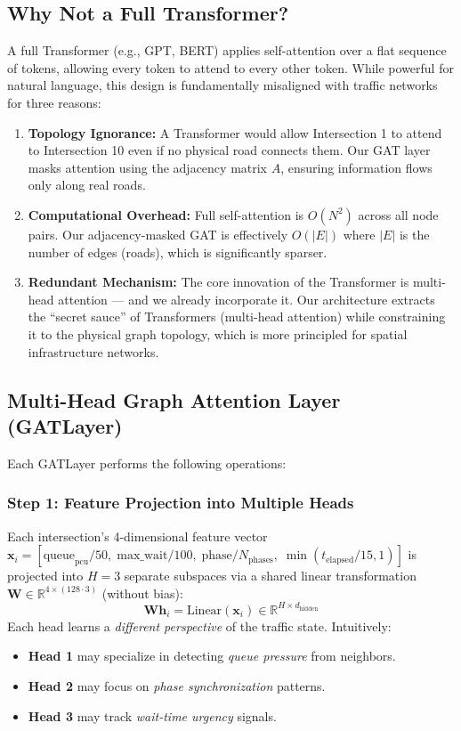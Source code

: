 \documentclass[12pt, onecolumn]{IEEEtran}
\begin{document}
\subsection{Why Not a Full Transformer?}
A full Transformer (e.g., GPT, BERT) applies self-attention over a flat sequence of tokens, allowing every token to attend to every other token. While powerful for natural language, this design is fundamentally misaligned with traffic networks for three reasons:
\begin{enumerate}
    \item \textbf{Topology Ignorance:} A Transformer would allow Intersection 1 to attend to Intersection 10 even if no physical road connects them. Our GAT layer masks attention using the adjacency matrix $A$, ensuring information flows only along real roads.
    \item \textbf{Computational Overhead:} Full self-attention is $O(N^2)$ across all node pairs. Our adjacency-masked GAT is effectively $O(|E|)$ where $|E|$ is the number of edges (roads), which is significantly sparser.
    \item \textbf{Redundant Mechanism:} The core innovation of the Transformer is multi-head attention --- and we already incorporate it. Our architecture extracts the ``secret sauce'' of Transformers (multi-head attention) while constraining it to the physical graph topology, which is more principled for spatial infrastructure networks.
\end{enumerate}

\subsection{Multi-Head Graph Attention Layer (GATLayer)}
Each GATLayer performs the following operations:

\subsubsection{Step 1: Feature Projection into Multiple Heads}
Each intersection's 4-dimensional feature vector $\mathbf{x}_i = [\text{queue}_{\text{pcu}}/50, \; \text{max\_wait}/100, \; \text{phase}/N_{\text{phases}}, \; \min(t_{\text{elapsed}}/15, 1)]$ is projected into $H=3$ separate subspaces via a shared linear transformation $\mathbf{W} \in \mathbb{R}^{4 \times (128 \cdot 3)}$ (without bias):
\begin{equation}
    \mathbf{W}\mathbf{h}_i = \text{Linear}(\mathbf{x}_i) \in \mathbb{R}^{H \times d_{\text{hidden}}}
\end{equation}
Each head learns a \textit{different perspective} of the traffic state. Intuitively:
\begin{itemize}
    \item \textbf{Head 1} may specialize in detecting \textit{queue pressure} from neighbors.
    \item \textbf{Head 2} may focus on \textit{phase synchronization} patterns.
    \item \textbf{Head 3} may track \textit{wait-time urgency} signals.
\end{itemize}
\end{document}
